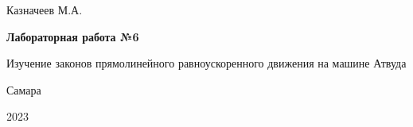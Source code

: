 \begin{titlepage}
	\begin{center}
		\Large{Казначеев М.А.}
	\end{center}
	\vspace*{\fill}
	\begin{center}
		\LARGE\textbf{Лабораторная работа №6}
		
		\addvspace{1em}
		
		\Large{Изучение законов прямолинейного равноускоренного движения на машине Атвуда}
		
	\end{center}
	\vspace*{\fill}
	\begin{center}
		\large{Самара}
		
		\large{2023}
	\end{center}
\end{titlepage}